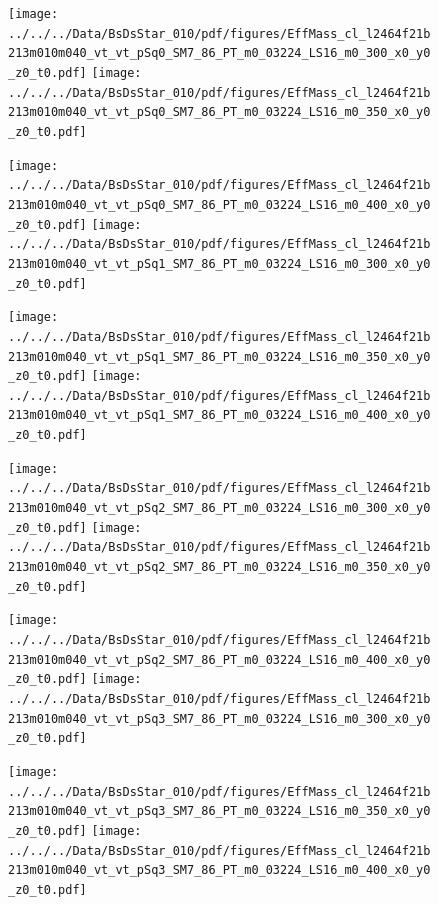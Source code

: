 \documentclass[a4paper,10pt]{article}
\begin{document}
\begin{figure}[p]
 \texttt{[image: ../../../Data/BsDsStar\_010/pdf/figures/EffMass\_cl\_l2464f21b213m010m040\_vt\_vt\_pSq0\_SM7\_86\_PT\_m0\_03224\_LS16\_m0\_300\_x0\_y0\_z0\_t0.pdf]} 
 \texttt{[image: ../../../Data/BsDsStar\_010/pdf/figures/EffMass\_cl\_l2464f21b213m010m040\_vt\_vt\_pSq0\_SM7\_86\_PT\_m0\_03224\_LS16\_m0\_350\_x0\_y0\_z0\_t0.pdf]} 
 \end{figure}
\begin{figure}[p]
 \texttt{[image: ../../../Data/BsDsStar\_010/pdf/figures/EffMass\_cl\_l2464f21b213m010m040\_vt\_vt\_pSq0\_SM7\_86\_PT\_m0\_03224\_LS16\_m0\_400\_x0\_y0\_z0\_t0.pdf]} 
 \texttt{[image: ../../../Data/BsDsStar\_010/pdf/figures/EffMass\_cl\_l2464f21b213m010m040\_vt\_vt\_pSq1\_SM7\_86\_PT\_m0\_03224\_LS16\_m0\_300\_x0\_y0\_z0\_t0.pdf]} 
 \end{figure}
\begin{figure}[p]
 \texttt{[image: ../../../Data/BsDsStar\_010/pdf/figures/EffMass\_cl\_l2464f21b213m010m040\_vt\_vt\_pSq1\_SM7\_86\_PT\_m0\_03224\_LS16\_m0\_350\_x0\_y0\_z0\_t0.pdf]} 
 \texttt{[image: ../../../Data/BsDsStar\_010/pdf/figures/EffMass\_cl\_l2464f21b213m010m040\_vt\_vt\_pSq1\_SM7\_86\_PT\_m0\_03224\_LS16\_m0\_400\_x0\_y0\_z0\_t0.pdf]} 
 \end{figure}
\clearpage
\begin{figure}[p]
 \texttt{[image: ../../../Data/BsDsStar\_010/pdf/figures/EffMass\_cl\_l2464f21b213m010m040\_vt\_vt\_pSq2\_SM7\_86\_PT\_m0\_03224\_LS16\_m0\_300\_x0\_y0\_z0\_t0.pdf]} 
 \texttt{[image: ../../../Data/BsDsStar\_010/pdf/figures/EffMass\_cl\_l2464f21b213m010m040\_vt\_vt\_pSq2\_SM7\_86\_PT\_m0\_03224\_LS16\_m0\_350\_x0\_y0\_z0\_t0.pdf]} 
 \end{figure}
\begin{figure}[p]
 \texttt{[image: ../../../Data/BsDsStar\_010/pdf/figures/EffMass\_cl\_l2464f21b213m010m040\_vt\_vt\_pSq2\_SM7\_86\_PT\_m0\_03224\_LS16\_m0\_400\_x0\_y0\_z0\_t0.pdf]} 
 \texttt{[image: ../../../Data/BsDsStar\_010/pdf/figures/EffMass\_cl\_l2464f21b213m010m040\_vt\_vt\_pSq3\_SM7\_86\_PT\_m0\_03224\_LS16\_m0\_300\_x0\_y0\_z0\_t0.pdf]} 
 \end{figure}
\begin{figure}[p]
 \texttt{[image: ../../../Data/BsDsStar\_010/pdf/figures/EffMass\_cl\_l2464f21b213m010m040\_vt\_vt\_pSq3\_SM7\_86\_PT\_m0\_03224\_LS16\_m0\_350\_x0\_y0\_z0\_t0.pdf]} 
 \texttt{[image: ../../../Data/BsDsStar\_010/pdf/figures/EffMass\_cl\_l2464f21b213m010m040\_vt\_vt\_pSq3\_SM7\_86\_PT\_m0\_03224\_LS16\_m0\_400\_x0\_y0\_z0\_t0.pdf]} 
 \end{figure}
\end{document}

